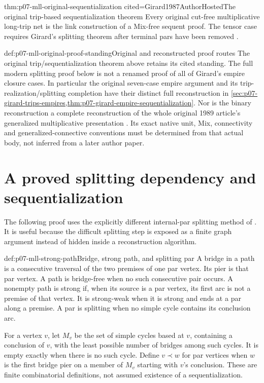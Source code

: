 \begin{hbtheorem}{thm:p07-mll-original-sequentialization}
 {cited=Girard1987AuthorHosted}{The original trip-based sequentialization theorem}
Every original cut-free multiplicative long-trip net is the link
construction of a Mix-free sequent proof. The tensor case requires
Girard's splitting theorem after terminal pars have been removed
\cite[Theorem~2.9, pp.~35--40]{Girard1987AuthorHosted}.
\end{hbtheorem}

\begin{proofboundary}{def:p07-mll-original-proof-standing}{Original and reconstructed proof routes}
The original trip/sequentialization theorem above retains its cited
standing. The full modern splitting proof below is not a renamed proof
of all of Girard's empire closure cases. In particular the original
seven-case empire argument and its trip-realization/splitting completion
have their distinct full reconstruction in
\cref{sec:p07-girard-trips-empires,thm:p07-girard-empire-sequentialization}.
Nor is the binary reconstruction a
complete reconstruction of the whole original 1989 article's generalized
multiplicative presentation \cite{DanosRegnier1989}. Its exact native
unit, Mix, connectivity and generalized-connective conventions must be
determined from that actual body, not inferred from a later author paper.
\end{proofboundary}

\section{A proved splitting dependency and sequentialization}
\label{sec:p07-mll-sequentialization}

The following proof uses the explicitly different internal-par splitting
method of \cite[Section~3]{DiGuardiaLaurentTortoraVaux2023Sequentialization}.
It is useful because the difficult splitting step is exposed as a
finite graph argument instead of hidden inside a reconstruction algorithm.

\begin{hbdefinition}{def:p07-mll-strong-path}{Bridge, strong path, and splitting par}
A bridge in a path is a consecutive traversal of the two premises of
one par vertex. Its pier is that par vertex. A path is bridge-free when
no such consecutive pair occurs. A nonempty path is strong if, when its
source is a par vertex, its first arc is not a premise of that vertex.
It is strong-weak when it is strong and ends at a par along a premise.
A par is splitting when no simple cycle contains its conclusion arc.

For a vertex \(v\), let \(M_v\) be the set of simple cycles based at
\(v\), containing a conclusion of \(v\), with the least possible number
of bridges among such cycles. It is empty exactly when there is no such
cycle. Define \(v\prec w\) for par vertices when \(w\) is the first
bridge pier on a member of \(M_v\) starting with \(v\)'s conclusion.
These are finite combinatorial definitions, not assumed existence of
a sequentialization.
\end{hbdefinition}

